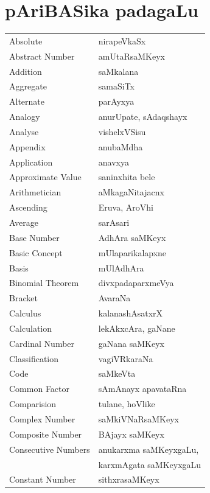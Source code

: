 \eject
\section*{\hspace{3.5cm}pAriBASika padagaLu}


\begin{longtable}{>{\rm}l@{\hspace{1.25cm}}l}
Absolute & nirapeVkaSx\\
Abstract Number & amUtaRsaMKeyx\\
Addition & saMkalana\\
Aggregate & samaSiTx\\
Alternate & parAyxya\\
Analogy & anurUpate, sAdaqshayx\\
Analyse & vishelxVSisu\\
Appendix & anubaMdha\\
Application & anavxya \\
Approximate Value & saninxhita bele\\
Arithmetician & aMkagaNitajacnx\\
Ascending & Eruva, AroVhi\\
Average & sarAsari \\
Base Number & AdhAra saMKeyx\\
Basic Concept & mUlaparikalapxne\\
Basis & mUlAdhAra \\
Binomial Theorem & divxpadaparxmeVya\\
Bracket & AvaraNa\\
Calculus & kalanashAsatxrX\\
Calculation & lekAkxcAra, gaNane\\
Cardinal Number & gaNana saMKeyx\\
Classification & vagiVRkaraNa\\
Code & saMkeVta\\
Common Factor & sAmAnayx apavataRna\\
Comparision & tulane, hoVlike\\
Complex Number & saMkiVNaRsaMKeyx\\
Composite Number & BAjayx saMKeyx\\
Consecutive Numbers & anukarxma saMKeyxgaLu,\\
                    & karxmAgata saMKeyxgaLu\\
Constant Number & sithxrasaMKeyx\\

\end{longtable}
